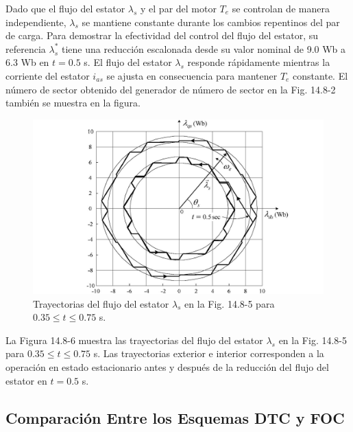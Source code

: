 \documentclass[letterpaper,12pt]{article}
\begin{document}
Dado que el flujo del estator $\lambda_s$ y el par del motor $T_e$ se controlan de manera independiente, $\lambda_s$ se mantiene constante durante los cambios repentinos del par de carga. Para demostrar la efectividad del control del flujo del estator, su referencia $\lambda_s^*$ tiene una reducción escalonada desde su valor nominal de 9.0 Wb a 6.3 Wb en $t = 0.5$ s. El flujo del estator $\lambda_s$ responde rápidamente mientras la corriente del estator $i_{as}$ se ajusta en consecuencia para mantener $T_e$ constante. El número de sector obtenido del generador de número de sector en la Fig. 14.8-2 también se muestra en la figura.

\begin{figure}[ht]
\centering
\includegraphics{graficos/img28.jpg}
\caption{Trayectorias del flujo del estator $\lambda_s$ en la Fig. 14.8-5 para $0.35 \leq t \leq 0.75$ s.}
\label{fig:14.8-6}
\end{figure}
\FloatBarrier

La Figura 14.8-6 muestra las trayectorias del flujo del estator $\lambda_s$ en la Fig. 14.8-5 para $0.35 \leq t \leq 0.75$ s. Las trayectorias exterior e interior corresponden a la operación en estado estacionario antes y después de la reducción del flujo del estator en $t = 0.5$ s.

\subsection{Comparación Entre los Esquemas DTC y FOC}
\end{document}

